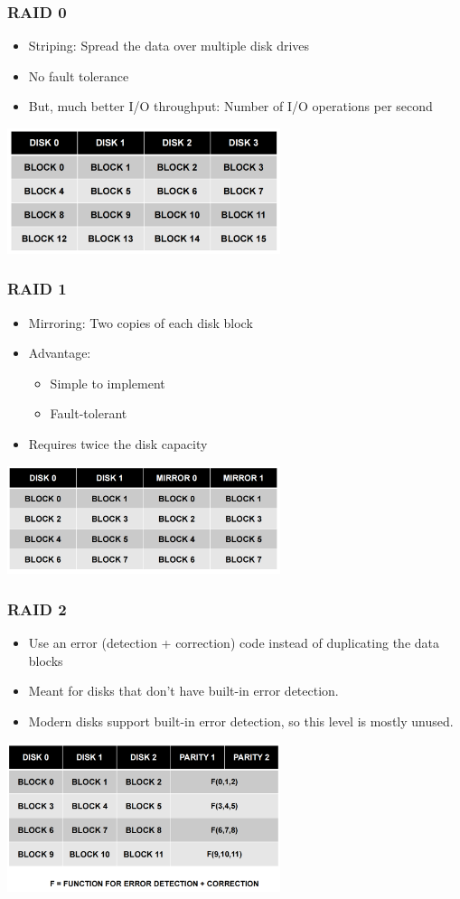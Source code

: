 \documentclass[12pt]{article}
\begin{document}
\subsubsection{RAID 0}
\begin{itemize}
    \item Striping: Spread the data over multiple disk drives
    \item No fault tolerance
    \item But, much better I/O throughput: Number of I/O operations per second
\end{itemize}
\includegraphics[width=0.6\textwidth]{Raid0.png}
\subsubsection{RAID 1}
\begin{itemize}
    \item Mirroring: Two copies of each disk block
    \item Advantage: \begin{itemize}
        \item Simple to implement
        \item Fault-tolerant
    \end{itemize}
    \item Requires twice the disk capacity
\end{itemize}
\includegraphics[width=0.6\textwidth]{Raid1.png}
\subsubsection{RAID 2}
\begin{itemize}
    \item Use an error (detection + correction) code instead of duplicating the data blocks 
    \item Meant for disks that don’t have built-in error detection. 
    \item Modern disks support built-in error detection, so this level is mostly unused.
\end{itemize}
\includegraphics[width=0.6\textwidth]{Raid2.png}
\end{document}
